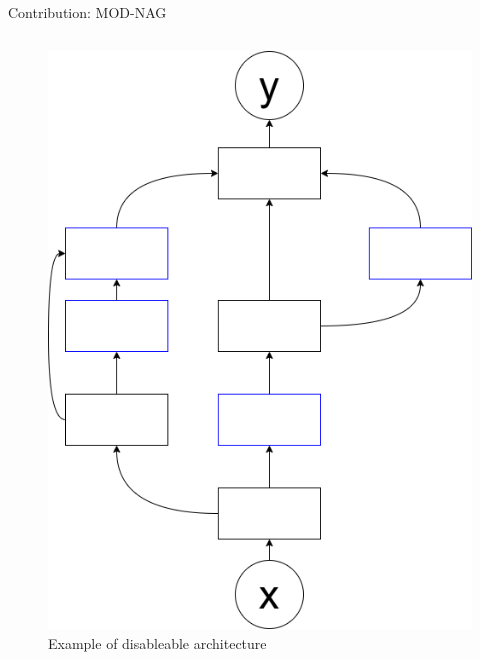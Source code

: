 \documentclass[aspectratio=169,xcolor=dvipsnames]{beamer}
\begin{document}
\begin{frame}{Contribution: MOD-NAG}
\begin{columns}[c]
        \begin{figure}[htbp]
            \centering
            \includegraphics[width=.7\textwidth]{diagram.drawio.png}
            \caption{Example of disableable architecture}
        \end{figure}
    \end{columns}
\end{frame}
\end{document}
